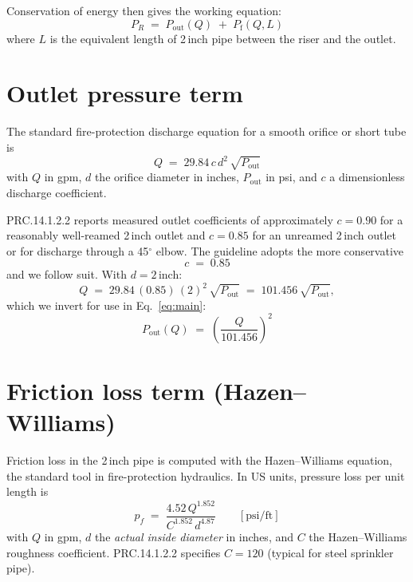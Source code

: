 \documentclass[11pt]{article}
\begin{document}
Conservation of energy then gives the working equation:
\begin{equation}
\boxed{\;P_R \;=\; P_{\text{out}}(Q) \;+\; P_{\text{f}}(Q, L)\;}
\label{eq:main}
\end{equation}
where $L$ is the equivalent length of 2\,inch pipe between the riser and
the outlet.

\section{Outlet pressure term}

The standard fire-protection discharge equation for a smooth orifice or
short tube is
\begin{equation}
Q \;=\; 29.84\, c\, d^{2}\, \sqrt{P_{\text{out}}}
\label{eq:disch}
\end{equation}
with $Q$ in gpm, $d$ the orifice diameter in inches, $P_{\text{out}}$ in psi,
and $c$ a dimensionless discharge coefficient.

PRC.14.1.2.2 reports measured outlet coefficients of approximately
$c=0.90$ for a reasonably well-reamed 2\,inch outlet and $c=0.85$ for an
unreamed 2\,inch outlet or for discharge through a 45$^\circ$ elbow. The
guideline adopts the more conservative
\[
c \;=\; 0.85
\]
and we follow suit. With $d = 2$\,inch:
\begin{equation}
Q \;=\; 29.84\,(0.85)\,(2)^{2}\,\sqrt{P_{\text{out}}}
   \;=\; 101.456\,\sqrt{P_{\text{out}}},
\end{equation}
which we invert for use in Eq.~\eqref{eq:main}:
\begin{equation}
\boxed{\;P_{\text{out}}(Q) \;=\; \left(\dfrac{Q}{101.456}\right)^{2}\;}
\label{eq:pout}
\end{equation}

\section{Friction loss term (Hazen--Williams)}

Friction loss in the 2\,inch pipe is computed with the Hazen--Williams
equation, the standard tool in fire-protection hydraulics. In US units,
pressure loss per unit length is
\begin{equation}
p_{f} \;=\; \dfrac{4.52\, Q^{1.852}}{C^{1.852}\, d^{4.87}}
\qquad [\text{psi/ft}]
\label{eq:hw}
\end{equation}
with $Q$ in gpm, $d$ the \emph{actual inside diameter} in inches, and $C$
the Hazen--Williams roughness coefficient. PRC.14.1.2.2 specifies $C=120$
(typical for steel sprinkler pipe).
\end{document}
